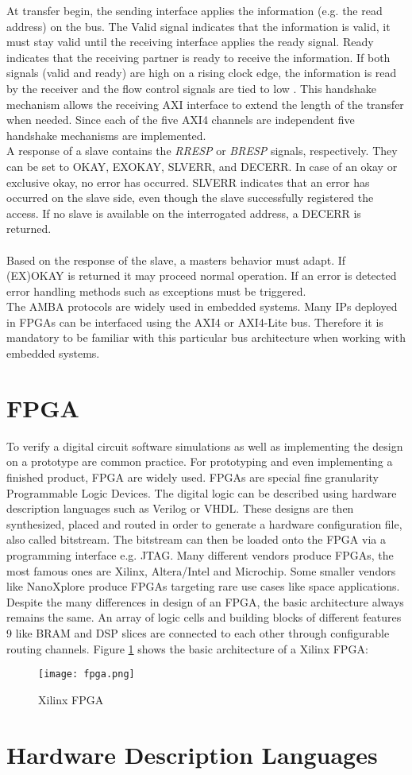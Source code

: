 At transfer begin, the sending interface applies the information (e.g. the read address) on the bus. The Valid signal indicates that the information is valid, it must stay valid until the receiving interface applies the ready signal. Ready indicates that the receiving partner is ready to receive the information. If both signals (valid and ready) are high on a rising clock edge, the information is read by the receiver and the flow control signals are tied to low \cite{AMBA:AXI}. This handshake mechanism allows the receiving \ac{AXI} interface to extend the length of the transfer when needed. Since each of the five \ac{AXI}4 channels are independent five handshake mechanisms are implemented.\\
A response of a slave contains the \textit{RRESP} or \textit{BRESP} signals, respectively. They can be set to OKAY, EXOKAY, SLVERR, and DECERR. In case of an okay or exclusive okay, no error has occurred. SLVERR indicates that an error has occurred on the slave side, even though the slave successfully registered the access. If no slave is available on the interrogated address, a DECERR is returned.\\\\
Based on the response of the slave, a masters behavior must adapt. If (EX)OKAY is returned it may proceed normal operation. If an error is detected error handling methods such as exceptions must be triggered. \\
The \ac{AMBA} protocols are widely used in embedded systems. Many \acp{IP} deployed in \acp{FPGA} can be interfaced using the \ac{AXI}4 or \ac{AXI4-Lite} bus. Therefore it is mandatory to be familiar with this particular bus architecture when working with embedded systems.




\section{FPGA}
To verify a digital circuit software simulations as well as implementing the design on
a prototype are common practice. For prototyping and even implementing a finished
product, FPGA are widely used.
FPGAs are special fine granularity Programmable Logic Devices. The digital logic
can be described using hardware description languages such as Verilog or VHDL.
These designs are then synthesized, placed and routed in order to generate a
hardware configuration file, also called bitstream. The bitstream can then be loaded
onto the FPGA via a programming interface e.g. JTAG.
Many different vendors produce FPGAs, the most famous ones are Xilinx,
Altera/Intel and Microchip. Some smaller vendors like NanoXplore produce FPGAs
targeting rare use cases like space applications.
Despite the many differences in design of an FPGA, the basic architecture always
remains the same. An array of logic cells and building blocks of different features
9 like BRAM and DSP slices are connected to each other through configurable routing
channels.
Figure \ref{fig:FPGA} shows the basic architecture of a Xilinx FPGA:\\

\begin{figure}[h]
\centering
\texttt{[image: fpga.png]}
\caption{Xilinx FPGA \cite{xilinx:2017}}
\label{fig:FPGA}
\end{figure}
\section{Hardware Description Languages}



